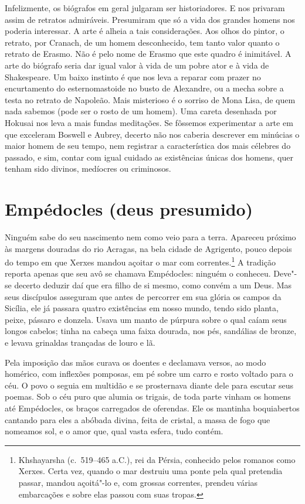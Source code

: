 Infelizmente, os biógrafos em geral julgaram ser historiadores. E
nos privaram assim de retratos admiráveis. Presumiram que só a vida dos
grandes homens nos poderia interessar. A arte é alheia a tais
considerações. Aos olhos do pintor, o retrato, por Cranach, de um homem
desconhecido, tem tanto valor quanto o retrato de Erasmo. Não é pelo nome
de Erasmo que este quadro é inimitável. A arte do biógrafo seria dar igual \label{vida}
valor à vida de um pobre ator e à vida de Shakespeare. Um baixo instinto é
que nos leva a reparar com prazer no encurtamento do esternomastoide no
busto de Alexandre, ou a mecha sobre a testa no retrato de Napoleão. Mais
misterioso é o sorriso de Mona Lisa, de quem nada sabemos (pode ser o
rosto de um homem). Uma careta desenhada por Hokusai nos leva a mais
fundas meditações. Se fôssemos experimentar a arte em que exceleram
Boswell e Aubrey, decerto não nos caberia descrever em minúcias o maior
homem de seu tempo, nem registrar a característica dos mais célebres do
passado, e sim, contar com igual cuidado as existências únicas
dos homens, quer tenham sido divinos, medíocres ou criminosos.


\chapter{Empédocles (deus presumido)}

Ninguém sabe do seu nascimento nem como veio para a terra. Apareceu próximo
às margens douradas do rio Acragas, na bela cidade de Agrigento, pouco
depois do tempo em que Xerxes mandou açoitar o mar com
correntes.\footnote{ Khshayarsha  (c.~519--465 a.C.), 
rei da Pérsia, conhecido pelos romanos como Xerxes. Certa vez,
quando o mar destruiu uma ponte pela qual pretendia passar, mandou
açoitá"-lo e, com grossas correntes, prendeu várias embarcações e sobre
elas passou com suas tropas.} A tradição reporta apenas que seu
avô se chamava Empédocles: ninguém o conheceu. Deve"-se decerto deduzir daí
que era filho de si mesmo, como convém a um Deus. Mas seus discípulos
asseguram que antes de percorrer em sua glória os campos da Sicília, ele
já passara quatro existências em nosso mundo, tendo sido planta, peixe,
pássaro e donzela. Usava um manto de púrpura sobre o qual caíam seus
longos cabelos; tinha na cabeça uma faixa dourada, nos pés, sandálias de
bronze, e levava grinaldas trançadas de louro e lã.

Pela imposição das mãos curava os doentes e declamava versos, ao modo
homérico, com inflexões pomposas, em pé sobre um carro e rosto voltado
para o céu. O povo o seguia em multidão e se prosternava diante dele para
escutar seus poemas. Sob o céu puro que alumia os trigais, de toda parte
vinham os homens até Empédocles, os braços carregados de oferendas. Ele os
mantinha boquiabertos cantando para eles a abóbada divina, feita de
cristal, a massa de fogo que nomeamos sol, e o amor que, qual vasta
esfera, tudo contém.

